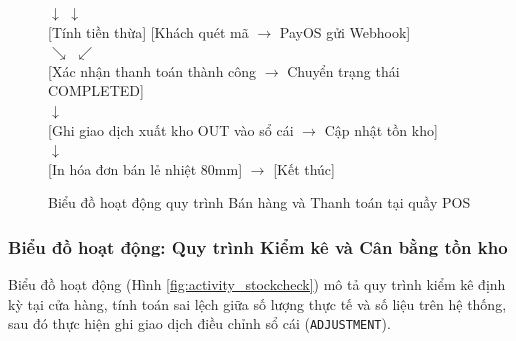 \begin{figure}[H]
\begin{minipage}{0.9\textwidth}
{{        $\downarrow$ \hspace{5.5cm} $\downarrow$\\[1mm]
        [Tính tiền thừa] \hspace{3cm} [Khách quét mã $\rightarrow$ PayOS gửi Webhook]\\[1mm]
        $\searrow$ \hspace{4cm} $\swarrow$\\[1mm]
        [Xác nhận thanh toán thành công $\rightarrow$ Chuyển trạng thái COMPLETED]\\[1mm]
        $\downarrow$\\[1mm]
        [Ghi giao dịch xuất kho OUT vào sổ cái $\rightarrow$ Cập nhật tồn kho]\\[1mm]
        $\downarrow$\\[1mm]
        [In hóa đơn bán lẻ nhiệt 80mm] $\longrightarrow$ [Kết thúc]\\[2mm]
    }
}
\end{minipage}
\caption{Biểu đồ hoạt động quy trình Bán hàng và Thanh toán tại quầy POS}
\label{fig:activity_checkout}
\end{figure}

\subsubsection{Biểu đồ hoạt động: Quy trình Kiểm kê và Cân bằng tồn kho}
Biểu đồ hoạt động (Hình \ref{fig:activity_stockcheck}) mô tả quy trình kiểm kê định kỳ tại cửa hàng, tính toán sai lệch giữa số lượng thực tế và số liệu trên hệ thống, sau đó thực hiện ghi giao dịch điều chỉnh sổ cái (\texttt{ADJUSTMENT}).

